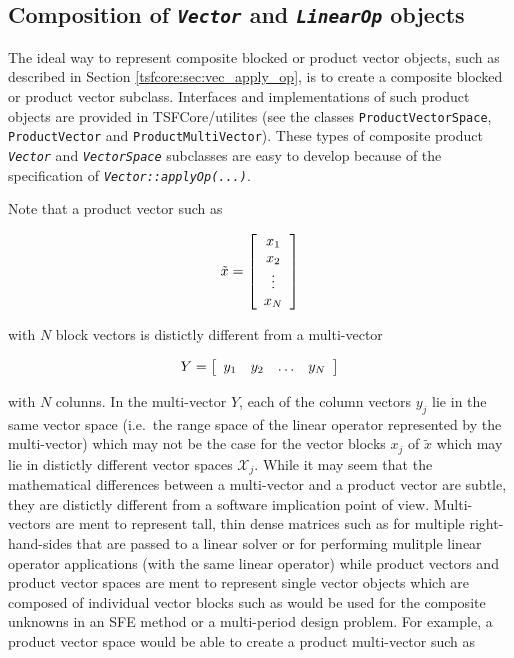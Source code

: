 %
\subsection{Composition of {}\texttt{\textit{Vector}} and {}\texttt{\textit{LinearOp}} objects}
\label{tsfcore:sec:composite_abstractions}
%

The ideal way to represent composite blocked or product vector
objects, such as described in Section
{}\ref{tsfcore:sec:vec_apply_op}, is to create a composite blocked or
product vector subclass.  Interfaces and implementations of such
product objects are provided in TSFCore/utilites (see the classes
{}\texttt{Product\-Vector\-Space}, {}\texttt{Product\-Vector} and
{}\texttt{Product\-Multi\-Vector}).  These types of composite product
{}\texttt{\textit{Vector}} and {}\texttt{\textit{VectorSpace}}
subclasses are easy to develop because of the specification of
{}\texttt{\textit{Vector\-::applyOp(\-...)}}.

Note that a product vector such as

\[
\tilde{x} = {\bmat{c} x_1 \\ x_2 \\ \vdots \\ x_N \emat}
\]

{}\noindent{}with $N$ block vectors is distictly different from a
multi-vector

\[
Y = {\bmat{cccc} y_1 & y_2 & \ldots & y_N \emat}
\]

{}\noindent{}with $N$ colunns.  In the multi-vector $Y$, each of the
column vectors $y_j$ lie in the same vector space (i.e.~the range
space of the linear operator represented by the multi-vector) which
may not be the case for the vector blocks $x_j$ of $\tilde{x}$ which
may lie in distictly different vector spaces $\mathcal{X}_j$.  While
it may seem that the mathematical differences between a multi-vector
and a product vector are subtle, they are distictly different from a
software implication point of view.  Multi-vectors are ment to
represent tall, thin dense matrices such as for multiple
right-hand-sides that are passed to a linear solver or for performing
mulitple linear operator applications (with the same linear operator)
while product vectors and product vector spaces are ment to represent
single vector objects which are composed of individual vector blocks
such as would be used for the composite unknowns in an SFE method or a
multi-period design problem.  For example, a product vector space
would be able to create a product multi-vector such as

